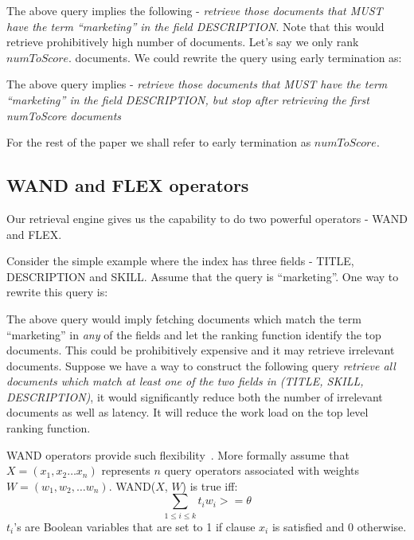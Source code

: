 
The above query implies the following - {\it retrieve those documents that MUST
have the term ``marketing'' in the field DESCRIPTION}. Note that this would
retrieve prohibitively high number of documents. Let's say we only rank
$numToScore$.
documents. We could rewrite the query using early termination as:


The above query implies - {\it retrieve those documents that MUST
have the term ``marketing'' in the field DESCRIPTION, but stop after retrieving
the first numToScore documents}

For the rest of the paper we shall refer to early termination as $numToScore$. 

\subsection{WAND and FLEX operators} \label{sec:wand}

Our retrieval engine gives us the capability to do two powerful operators -
WAND and FLEX.

Consider the simple example where the index has three fields - TITLE,
DESCRIPTION and SKILL. Assume that the query is ``marketing''. One way
to rewrite this query is:


The above query would imply fetching documents which match the term ``marketing'' in {\it
any} of the fields and let the ranking function identify the top documents. This could be
prohibitively expensive and it may retrieve irrelevant documents. Suppose we
have a way to construct the following query {\it retrieve all documents which
match at least one of the two fields in (TITLE, SKILL, DESCRIPTION)}, it would
significantly reduce both the number of irrelevant documents as well as
latency. It will reduce the work load on the top level ranking function.

WAND operators provide such flexibility~\cite{broder2003efficient}. More
formally assume that $ X = (x_1, x_2 \ldots x_n)$ represents $n$ query operators
associated with weights $ W = (w_1, w_2, \ldots w_n)$. WAND($X$, $W$)
is true iff:
\begin{equation}
    \sum_{1 \leq i \leq k} t_i w_i >= \theta
\label{eqn:wand}
\end{equation}
$t_i$'s are Boolean variables that are set to 1 if clause $x_i$ is satisfied
and 0 otherwise. 

